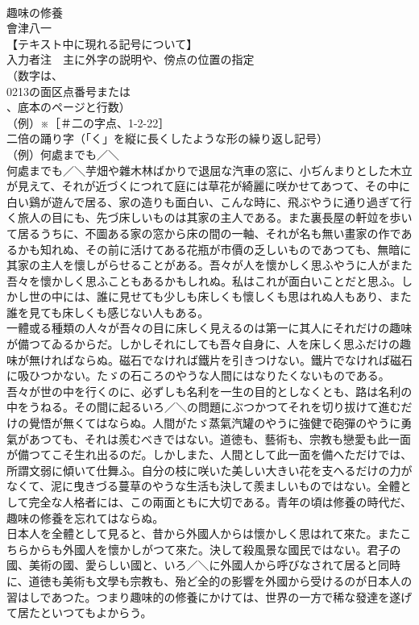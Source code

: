 \documentclass[8pt]{extreport}
\begin{document}
\begin{CJK}{UTF8}{min}
\\	趣味の修養
\\	會津八一
\\	【テキスト中に現れる記号について】
\\	入力者注　主に外字の説明や、傍点の位置の指定
\\	（数字は、
\\	0213の面区点番号または
\\	、底本のページと行数）
\\	（例）※［＃二の字点、1-2-22］
\\	二倍の踊り字（「く」を縦に長くしたような形の繰り返し記号）
\\	（例）何處までも／＼
\\	何處までも／＼芋畑や雜木林ばかりで退屈な汽車の窓に、小ぢんまりとした木立が見えて、それが近づくにつれて庭には草花が綺麗に咲かせてあつて、その中に白い鷄が遊んで居る、家の造りも面白い、こんな時に、飛ぶやうに通り過ぎて行く旅人の目にも、先づ床しいものは其家の主人である。また裏長屋の軒竝を歩いて居るうちに、不圖ある家の窓から床の間の一軸、それが名も無い畫家の作であるかも知れぬ、その前に活けてある花瓶が市價の乏しいものであつても、無暗に其家の主人を懷しがらせることがある。吾々が人を懷かしく思ふやうに人がまた吾々を懷かしく思ふこともあるかもしれぬ。私はこれが面白いことだと思ふ。しかし世の中には、誰に見せても少しも床しくも懷しくも思はれぬ人もあり、また誰を見ても床しくも感じない人もある。
\\	一體或る種類の人々が吾々の目に床しく見えるのは第一に其人にそれだけの趣味が備つてゐるからだ。しかしそれにしても吾々自身に、人を床しく思ふだけの趣味が無ければならぬ。磁石でなければ鐵片を引きつけない。鐵片でなければ磁石に吸ひつかない。たゞの石ころのやうな人間にはなりたくないものである。
\\	吾々が世の中を行くのに、必ずしも名利を一生の目的としなくとも、路は名利の中をうねる。その間に起るいろ／＼の問題にぶつかつてそれを切り拔けて進むだけの覺悟が無くてはならぬ。人間がたゞ蒸氣汽罐のやうに強健で砲彈のやうに勇氣があつても、それは羨むべきではない。道徳も、藝術も、宗教も戀愛も此一面が備つてこそ生れ出るのだ。しかしまた、人間として此一面を備へただけでは、所謂文弱に傾いて仕舞ふ。自分の枝に咲いた美しい大きい花を支へるだけの力がなくて、泥に曳きづる蔓草のやうな生活も決して羨ましいものではない。全體として完全な人格者には、この兩面ともに大切である。青年の頃は修養の時代だ、趣味の修養を忘れてはならぬ。
\\	日本人を全體として見ると、昔から外國人からは懷かしく思はれて來た。またこちらからも外國人を懷かしがつて來た。決して殺風景な國民ではない。君子の國、美術の國、愛らしい國と、いろ／＼に外國人から呼びなされて居ると同時に、道徳も美術も文學も宗教も、殆ど全的の影響を外國から受けるのが日本人の習はしであつた。つまり趣味的の修養にかけては、世界の一方で稀な發達を遂げて居たといつてもよからう。

\end{CJK}
\end{document}
